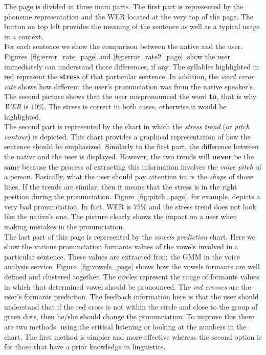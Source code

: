 \noindent The page is divided in three main parts. The first part is represented by the phoneme representation and the WER located at the very top of the page. The button on top left provides the meaning of the sentence as well as a typical usage in a context.\\
\noindent For each sentence we show the comparison between the native and the user. Figures~\ref{fig:error_rate_page} and \ref{fig:error_rate2_page}, show the user immediately can understand those differences, if any. The syllables highlighted in red represent the \textbf{stress} of that particular sentence. In addition, the \textit{word error rate} shows how different the user's pronunciation was from the native speaker's. The second picture shows that the user mispronounced the word \textbf{to}, that is why \textit{WER} is $10\%$. The stress is correct in both cases, otherwise it would be highlighted. \\

\noindent The second part is represented by the chart in which the \textit{stress trend} (or \textit{pitch contour}) is depicted. This chart provides a graphical representation of how the sentence should be emphasized. Similarly to the first part, the difference between the native and the user is displayed. However, the two trends will \textbf{never} be the same because the process of extracting this information involves the \textit{voice pitch} of a person. Basically, what the user should pay attention to, is the \textit{shape} of those lines. If the trends are similar, then it means that the stress is in the right position during the pronunciation. Figure~\ref{fig:pitch_page}, for example, depicts a very bad pronunciation. In fact, WER is $75\%$ and the stress trend does not look like the native's one. The picture clearly shows the impact on a user when making mistakes in the pronunciation. \\

\noindent The last part of this page is represented by the \textit{vowels prediction} chart. Here we show the various pronunciation formants values of the vowels involved in a particular sentence. These values are extracted from the GMM in the voice analysis service. Figure~\ref{fig:vowels_page} shows how the vowels formants are well defined and clustered together. The circles represent the range of formants values in which that determined vowel should be pronounced. The \textit{red crosses} are the user's formants prediction. The feedback information here is that the user should understand that if the red cross is not within the circle and close to the group of green dots, then he/she should change the pronunciation. To improve this there are two methods: using the critical listening or looking at the numbers in the chart. The first method is simpler and more effective whereas the second option is for those that have a prior knowledge in linguistics. \\

